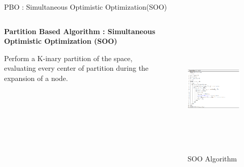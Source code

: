 \begin{frame}{PBO : Simultaneous Optimistic Optimization(SOO)}
    \begin{columns}
        \begin{column}[b]{0.4\textwidth}
            \textbf{Partition Based Algorithm : Simultaneous Optimistic Optimization (SOO)}

            Perform a K-inary partition of the space, evaluating every center of partition during the expansion of a node.
            
        \end{column}        
        \begin{column}{0.6\textwidth}
            \begin{figure}[h]
                \centering
                \includegraphics[trim={0 0 7cm 0},clip,height = 6.5cm]{imgs/algo/soo.png}
                \caption{SOO Algorithm}
            \end{figure}
        \end{column}
    \end{columns}
\end{frame}

